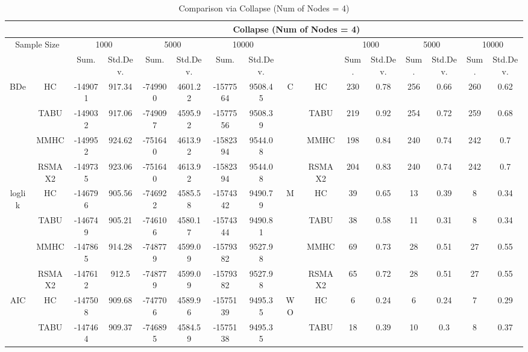 \begin{table}[p]																										
\centering	\caption{Comparison  via Collapse (Num of Nodes = 4)}	\tiny																						
{\tabcolsep=0.01in																										
\begin{tabular}{cc||cc|cc|cc||cc|cc|cc|cc}																										
\hline																										
&	&	\multicolumn{14}{c}{Collapse	(Num	of	Nodes	=	4)}\tabularnewline																			
\hline																										
\multicolumn{2}{c||}{Sample	Size}	&	\multicolumn{2}{c|}{1000}	&	\multicolumn{2}{c|}{5000}	&	\multicolumn{2}{c||}{10000}	&	&	&	\multicolumn{2}{c|}{1000}	&	\multicolumn{2}{c|}{5000}	&	\multicolumn{2}{c}{10000}\tabularnewline											
\hline																										
&	&	Sum.	&	Std.Dev.	&	Sum.	&	Std.Dev.	&	Sum.	&	Std.Dev.	&	&	&	Sum.	&	Std.Dev.	&	Sum.	&	Std.Dev.	&	Sum.	&	Std.Dev.\tabularnewline
\hline																										
\hline																										
\multirow{4}{*}{BDe} & HC &	-149071 & 	917.34 & 	-749900 & 	4601.22 & 	-1577564 & 	9508.45 & 	\multirow{4}{*}{C} & HC &	230 & 	0.78 & 	256 & 	0.66 & 	260 & 	0.62\tabularnewline													
& TABU &	-149032 & 	917.06 & 	-749097 & 	4595.92 & 	-1577556 & 	9508.39 & 	& TABU &	219 & 	0.92 & 	254 & 	0.72 & 	259 & 	0.68\tabularnewline													
& MMHC &	-149952 & 	924.62 & 	-751640 & 	4613.92 & 	-1582394 & 	9544.08 & 	& MMHC &	198 & 	0.84 & 	240 & 	0.74 & 	242 & 	0.7\tabularnewline													
& RSMAX2 &	-149735 & 	923.06 & 	-751640 & 	4613.92 & 	-1582394 & 	9544.08 & 	& RSMAX2 &	204 & 	0.83 & 	240 & 	0.74 & 	242 & 	0.7\tabularnewline													
\hline																										
\multirow{4}{*}{loglik} & HC &	-146796 & 	905.56 & 	-746922 & 	4585.58 & 	-1574342 & 	9490.79 & 	\multirow{4}{*}{M} & HC &	39 & 	0.65 & 	13 & 	0.39 & 	8 & 	0.34\tabularnewline													
& TABU &	-146749 & 	905.21 & 	-746106 & 	4580.17 & 	-1574344 & 	9490.81 & 	& TABU &	38 & 	0.58 & 	11 & 	0.31 & 	8 & 	0.34\tabularnewline													
& MMHC &	-147865 & 	914.28 & 	-748779 & 	4599.09 & 	-1579382 & 	9527.98 & 	& MMHC &	69 & 	0.73 & 	28 & 	0.51 & 	27 & 	0.55\tabularnewline													
& RSMAX2 &	-147612 & 	912.5 & 	-748779 & 	4599.09 & 	-1579382 & 	9527.98 & 	& RSMAX2 &	65 & 	0.72 & 	28 & 	0.51 & 	27 & 	0.55\tabularnewline													
\hline																										
\multirow{4}{*}{AIC} & HC &	-147508 & 	909.68 & 	-747706 & 	4589.96 & 	-1575139 & 	9495.35 & 	\multirow{4}{*}{WO} & HC &	6 & 	0.24 & 	6 & 	0.24 & 	7 & 	0.29\tabularnewline													
& TABU &	-147464 & 	909.37 & 	-746895 & 	4584.59 & 	-1575138 & 	9495.35 & 	& TABU &	18 & 	0.39 & 	10 & 	0.3 & 	8 & 	0.37\tabularnewline													

\end{tabular}}
\end{table}
